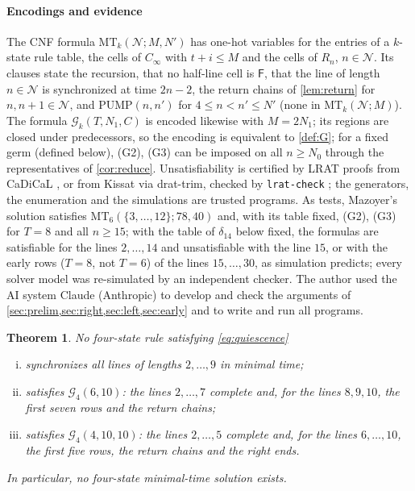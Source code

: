 \documentclass[3p]{elsarticle}
\newtheorem{theorem}{Theorem}[section]
\theoremstyle{definition}
\newcommand{\Fq}{\mathsf F}
\newcommand{\G}{\mathcal G}
\begin{document}
\paragraph{Encodings and evidence} The CNF formula $\mathrm{MT}_k(\mathcal
N;M,N')$ has one-hot variables for the entries of a $k$-state rule table, the
cells of $C_\infty$ with $t+i\le M$ and the cells of $R_n$, $n\in\mathcal N$.
Its clauses state the recursion, that no half-line cell is $\Fq$, that the
line of length $n\in\mathcal N$ is synchronized at time $2n-2$, the return
chains of \cref{lem:return} for $n,n+1\in\mathcal N$, and
$\mathrm{PUMP}(n,n')$ for $4\le n<n'\le N'$ (none in $\mathrm{MT}_k(\mathcal
N;M)$). The formula $\G_k(T,N_1,C)$ is encoded likewise with $M=2N_1$; its
regions are closed under predecessors, so the encoding is equivalent to
\cref{def:G}; for a fixed germ (defined below), (G2), (G3) can be imposed on
all $n\ge N_0$ through the representatives of \cref{cor:reduce}.
Unsatisfiability is certified by LRAT proofs \cite{CruzFilipeEtAl17} from
CaDiCaL \cite{CaDiCaL2}, or from Kissat \cite{Kissat20} via
\textsf{drat-trim}, checked by \texttt{lrat-check} \cite{WetzlerHeuleHunt14};
the generators, the enumeration and the simulations are trusted programs. As
tests, Mazoyer's solution \cite{Duprat97} satisfies
$\mathrm{MT}_6(\{3,\dots,12\};78,40)$ and, with its table fixed, (G2), (G3)
for $T=8$ and all $n\ge15$; with the table of $\delta_{14}$ below fixed, the
formulas are satisfiable for the lines $2,\dots,14$ and unsatisfiable with the
line $15$, or with the early rows ($T=8$, not $T=6$) of the lines
$15,\dots,30$, as simulation predicts; every solver model was re-simulated by
an independent checker. The author used the AI system Claude (Anthropic) to
develop and check the arguments of
\cref{sec:prelim,sec:right,sec:left,sec:early} and to write and run all
programs.

\begin{theorem}\label{thm:four}
No four-state rule satisfying \eqref{eq:quiescence}
\begin{enumerate}[(i)]
\item synchronizes all lines of lengths $2,\dots,9$ in minimal time;
\item satisfies $\G_4(6,10)$: the lines $2,\dots,7$ complete and, for the lines
$8,9,10$, the first seven rows and the return chains;
\item satisfies $\G_4(4,10,10)$: the lines $2,\dots,5$ complete and, for the
lines $6,\dots,10$, the first five rows, the return chains and the right ends.
\end{enumerate}
In particular, no four-state minimal-time solution exists.
\end{theorem}
\end{document}
